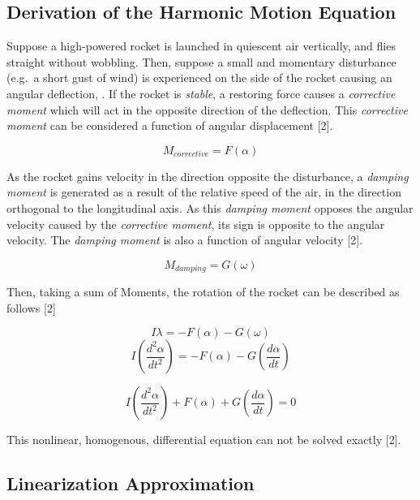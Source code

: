 \documentclass[]{article}
\begin{document}
\subsection{Derivation of the Harmonic Motion
Equation}\label{derivation-of-the-harmonic-motion-equation}

Suppose a high-powered rocket is launched in quiescent air vertically,
and flies straight without wobbling. Then, suppose a small and momentary
disturbance (e.g.~a short gust of wind) is experienced on the side of
the rocket causing an angular deflection, . If the rocket is
\emph{stable}, a restoring force causes a \emph{corrective moment} which
will act in the opposite direction of the deflection. This
\emph{corrective moment} can be considered a function of angular
displacement {[}2{]}.

\begin{equation}
M_{corrective} = F (\alpha)
\end{equation}

As the rocket gains velocity in the direction opposite the disturbance,
a \emph{damping moment} is generated as a result of the relative speed
of the air, in the direction orthogonal to the longitudinal axis. As
this \emph{damping moment} opposes the angular velocity caused by the
\emph{corrective moment}, its sign is opposite to the angular velocity.
The \emph{damping moment} is also a function of angular velocity
{[}2{]}.

\begin{equation}
M_{damping} = G (\omega)
\end{equation}

Then, taking a sum of Moments, the rotation of the rocket can be
described as follows {[}2{]}

\[
I \lambda = -F(\alpha) - G(\omega) 
\] \[
I \left( \dfrac{d^2\alpha}{dt^2} \right) = -F(\alpha) - G \left(\dfrac{d\alpha}{dt} \right) 
\]

\begin{equation}
\label{eq_rocket_diff}
I \left( \dfrac{d^2\alpha}{dt^2} \right) + F(\alpha) + G \left(\dfrac{d\alpha}{dt} \right) = 0
\end{equation}

This nonlinear, homogenous, differential equation can not be solved
exactly {[}2{]}.

\subsection{Linearization
Approximation}\label{linearization-approximation}
\end{document}
